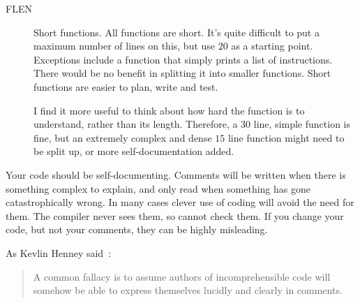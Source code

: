 \begin{description}
\item[FLEN] Short functions. All functions are short. It's quite
difficult to put a maximum number of lines on this, but use $20$ as a
starting point. Exceptions include a function that simply prints a list
of instructions. There would be no benefit in splitting it into smaller
functions. Short functions are easier to plan, write and test.

I find it more useful to think about how hard the function is to
understand, rather than its length. Therefore, a $30$ line, simple
function is fine, but an extremely complex and dense $15$ line function
might need to be split up, or more self-documentation added.


\end{description}


Your code should be self-documenting. Comments will be written when there
is something complex to explain, and only read when something has gone
catastrophically wrong. In many cases clever use of coding will avoid the
need for them.  The compiler never sees them, so cannot check them. If you
change your code, but not your comments, they can be highly misleading.

As Kevlin Henney said~:
\begin{quote}
A common fallacy is to assume authors of incomprehensible code will somehow
be able to express themselves lucidly and clearly in comments. 
\end{quote}


